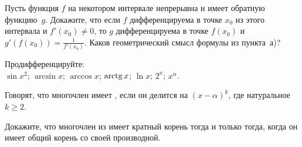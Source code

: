 \documentclass[a4paper,12pt]{article}
\begin{document}
 Пусть функция $f$ на некотором
интервале непрерывна и имеет обратную функцию~$g$. Докажите, что если $f$
дифференцируема в точке $x_0$ из этого интервала и $f'(x_0)\ne 0$, то %
$g$ дифференцируема в точке $f(x_0)$ и $g'(f(x_0))=\frac{1}{f'(x_0)}$.
 Каков геометрический смысл формулы из пункта~а)?

 Продифференцируйте:\\
 $\sin x^2$;
 $\arcsin x$;
 $\arccos x$;
 $\arctg x$;
 $\ln x$;
 $2^x$;
 $x^\alpha$.

Говорят, что многочлен имеет , если он делится на $(x-\alpha)^k$, где натуральное $k\geq2$.

Докажите, что многочлен из имеет кратный
корень тогда и только
тогда, когда он имеет общий
корень со своей производной.




\end{document}
